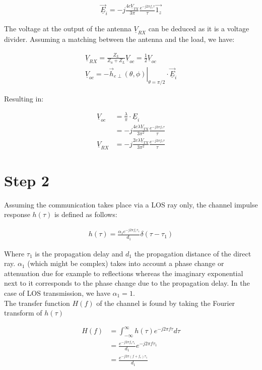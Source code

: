 \documentclass[10pt,a4paper]{ULBreport}
\begin{document}
\begin{align*}
    \underline{\vec{E}}_i = -j\frac{4 c \underline{V}_{TX}}{3\pi}\frac{e^{-j 2\pi f_c \tau}}{\tau}\vec{1_z}
\end{align*}

The voltage at the output of the antenna $\underline{V}_{RX}$ can be deduced as it is a voltage divider. Assuming a matching between the antenna and the load, we have:

\begin{align*}
    \underline{V}_{RX} = \frac{Z_L}{Z_a + Z_L} \underline{V}_{oc} = \frac{1}{2} \underline{V}_{oc}\\
    \underline{V}_{oc} = -\left . \vec{h}_{e\perp}(\theta, \phi)\right\vert_{\theta = \pi/2} \cdot \underline{\vec{E}}_i
\end{align*}

Resulting in:

\begin{align*}
    \underline{V}_{oc} &= \frac{\lambda}{\pi} \cdot \underline{E}_i\\
    &= -j\frac{4 c \lambda \underline{V}_{TX}}{3\pi^2}\frac{e^{-j 2\pi f_c \tau}}{\tau}\\
    \underline{V}_{RX} &= -j\frac{2 c \lambda \underline{V}_{TX}}{3\pi^2}\frac{e^{-j 2\pi f_c \tau}}{\tau}
\end{align*}

\section{Step 2}

Assuming the communication takes place via a LOS ray only, the channel impulse response $h(\tau)$ is defined as follows:

\begin{align*}
    h(\tau) = \frac{\alpha_1 e^{-j2\pi f_c \tau_1}}{d_1} \delta(\tau - \tau_1)
\end{align*}

Where $\tau_1$ is the propagation delay and $d_1$ the propagation distance of the direct ray. $\alpha_1$ (which might be complex) takes into account a phase change or attenuation due for example to reflections whereas the imaginary exponential next to it corresponds to the phase change due to the propagation delay. In the case of LOS transmission, we have $\alpha_1 = 1$.\\
The transfer function $H(f)$ of the channel is found by taking the Fourier transform of $h(\tau)$

\begin{align*}
    H(f) &= \int_{-\infty}^{\infty} h(\tau) e^{-j2\pi f \tau} d\tau\\
    &= \frac{e^{-j2\pi f_c \tau_1}}{d_1}e^{-j2\pi f \tau_1}\\
    &= \frac{e^{-j2\pi (f+f_c) \tau_1}}{d_1}\\
\end{align*}
\end{document}
